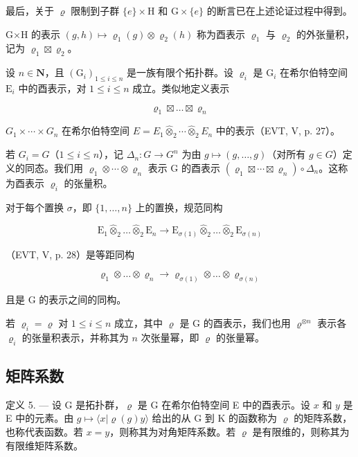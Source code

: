 最后，关于 \(\varrho\) 限制到子群 \(\{e\} \times \mathrm{H}\) 和 \(\mathrm{G} \times \{e\}\) 的断言已在上述论证过程中得到。

G×H 的表示 \((g,h)\mapsto\varrho_{1}(g)\otimes\varrho_{2}(h)\) 称为酉表示 \(\varrho_{1}\) 与 \(\varrho_{2}\) 的外张量积，记为 \(\varrho_{1}\boxtimes\varrho_{2}\)。

设 \(n \in \mathbf{N}\)，且 \((\mathrm{G}_i)_{1 \leqslant i \leqslant n}\) 是一族有限个拓扑群。设 \(\varrho_i\) 是 \(\mathrm{G}_i\) 在希尔伯特空间 \(\mathrm{E}_i\) 中的酉表示，对 \(1 \leqslant i \leqslant n\) 成立。类似地定义表示

\[
\varrho_ {1} \boxtimes \dots \boxtimes \varrho_ {n}
\]

\(G_{1} \times \cdots \times G_{n}\) 在希尔伯特空间 \(E = E_{1} \widehat{\otimes}_{2} \cdots \widehat{\otimes}_{2} E_{n}\) 中的表示（EVT, V, p. 27）。

若 \(G_{i} = G\)（\(1 \leqslant i \leqslant n\)），记 \(\Delta_{n}: G \to G^{n}\) 为由 \(g \mapsto (g, \ldots, g)\)（对所有 \(g \in G\)）定义的同态。我们用 \(\varrho_{1} \otimes \cdots \otimes \varrho_{n}\) 表示 G 的酉表示 \((\varrho_{1} \boxtimes \cdots \boxtimes \varrho_{n}) \circ \Delta_{n}\)。这称为酉表示 \(\varrho_{i}\) 的张量积。

对于每个置换 \(\sigma\)，即 \(\{1,\ldots,n\}\) 上的置换，规范同构

\[
\mathrm{E} _ {1} \widehat {\otimes} _ {2} \dots \widehat {\otimes} _ {2} \mathrm{E} _ {n} \rightarrow \mathrm{E} _ {\sigma (1)} \widehat {\otimes} _ {2} \dots \widehat {\otimes} _ {2} \mathrm{E} _ {\sigma (n)}
\]

（EVT, V, p. 28）是等距同构

\[
\varrho_ {1} \otimes \dots \otimes \varrho_ {n} \rightarrow \varrho_ {\sigma (1)} \otimes \dots \otimes \varrho_ {\sigma (n)}
\]

且是 G 的表示之间的同构。

若 \(\varrho_{i}=\varrho\) 对 \(1\leqslant i\leqslant n\) 成立，其中 \(\varrho\) 是 G 的酉表示，我们也用 \(\varrho^{\otimes n}\) 表示各 \(\varrho_{i}\) 的张量积表示，并称其为 \(n\) 次张量幂，即 \(\varrho\) 的张量幂。

\subsection{矩阵系数}

定义 5. --- 设 G 是拓扑群，\(\varrho\) 是 G 在希尔伯特空间 E 中的酉表示。设 \(x\) 和 \(y\) 是 E 中的元素。由 \(g \mapsto \langle x | \varrho(g)y \rangle\) 给出的从 G 到 K 的函数称为 \(\varrho\) 的矩阵系数，也称代表函数。若 \(x = y\)，则称其为对角矩阵系数。若 \(\varrho\) 是有限维的，则称其为有限维矩阵系数。

